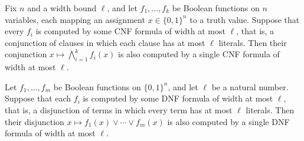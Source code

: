 \begin{theorem}
\label{LMN.compression_and_of_cnfs}
\leanok
{}
Fix $n$ and a width bound $\ell$, and let $f_1, \dots, f_k$ be Boolean functions on $n$
variables, each mapping an assignment $x \in \{0,1\}^n$ to a truth value. Suppose that
every $f_i$ is computed by some CNF formula of width at most $\ell$, that is, a
conjunction of clauses in which each clause has at most $\ell$ literals. Then their
conjunction $x \mapsto \bigwedge_{i=1}^{k} f_i(x)$ is also computed by a single CNF
formula of width at most $\ell$.
\end{theorem}

\begin{theorem}
\label{LMN.compression_or_of_dnfs}
\leanok
{}
Let $f_1, \dots, f_m$ be Boolean functions on $\{0,1\}^n$, and let $\ell$ be a natural
number. Suppose that each $f_i$ is computed by some DNF formula of width at most $\ell$,
that is, a disjunction of terms in which every term has at most $\ell$ literals. Then
their disjunction $x \mapsto f_1(x) \lor \cdots \lor f_m(x)$ is also computed by a
single DNF formula of width at most $\ell$.
\end{theorem}


